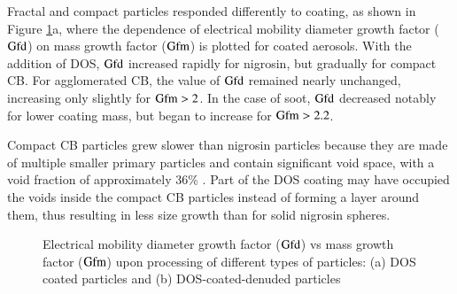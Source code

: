 \documentclass[12pt,authoryear]{elsarticle}
\begin{document}
Fractal and compact particles responded differently to coating, as shown in Figure \ref{fig:gfd}a, where the dependence of electrical mobility diameter growth factor ($\rm Gfd$) on mass growth factor ($\rm Gfm$) is plotted for coated aerosols. With the addition of DOS, $\rm Gfd$ increased rapidly for nigrosin, but gradually for compact CB. For agglomerated CB, the value of $\rm Gfd$ remained nearly unchanged, increasing only slightly for $\rm Gfm > 2$. In the case of soot, $\rm Gfd$ decreased notably for lower coating mass, but began to increase for $\rm Gfm > 2.2$.

Compact CB particles grew slower than nigrosin particles because they are made of multiple smaller primary particles and contain significant void space, with a void fraction of approximately 36\% \citep{RN18}. Part of the DOS coating may have occupied the voids inside the compact CB particles instead of forming a layer around them, thus resulting in less size growth than for solid nigrosin spheres. 

\begin{figure}[htp]
    \centering
    \caption{Electrical mobility diameter growth factor ($\rm Gfd$) vs mass growth factor ($\rm Gfm$) upon processing of different types of particles: (a) DOS coated particles and (b) DOS-coated-denuded particles}
    \label{fig:gfd}
\end{figure}
\end{document}
